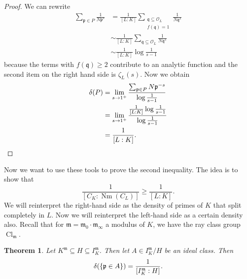 \documentclass[leqno, openany]{memoir}
\newtheorem{thm}{Theorem}[section]
\theoremstyle{definition}
\theoremstyle{remark}
\theoremstyle{plain}
\theoremstyle{definition}
\theoremstyle{remark}
\newcommand{\mc}[1]{\mathcal{#1}}
\newcommand{\mf}[1]{\mathfrak{#1}}
\DeclareMathOperator{\Cl}{Cl}
\DeclareMathOperator{\Nm}{Nm}
\begin{document}
\begin{proof}
    We can rewrite
    \begin{align*}
        \sum_{\mf{p} \in P} \frac{1}{N\mf{p}^s} &= \frac{1}{[L:K]} \sum_{\substack{\mf{q} \subseteq \mc{O}_L \\ f(\mf{q}) = 1}} \frac{1}{N\mf{q}^s} \\
                                                &\sim \frac{1}{[L:K]} \sum_{\mf{q} \subseteq \mc{O}_L} \frac{1}{N\mf{q}^s} \\
                                                &\sim \frac{1}{[L:K]} \log \frac{1}{s-1}
    \end{align*}
    because the terms with $f(\mf{q}) \geq 2$ contribute to an analytic function and the second item on the right hand side is $\zeta_L(s)$. Now we obtain
    \begin{align*}
        \delta(P) &= \lim_{s \to 1^+} \frac{\sum_{\mf{p} \in P} N\mf{p}^{-s}}{\log \frac{1}{s-1}} \\
                  &= \lim_{s \to 1^+} \frac{\frac{1}{[L:K]} \log \frac{1}{s-1}}{\log \frac{1}{s-1}} \\
                  &= \frac{1}{[L:K]}. \qedhere
    \end{align*}
\end{proof}

Now we want to use these tools to prove the second inequality. The idea is to show that
\[ \frac{1}{[C_K: \Nm(C_L)]} \geq \frac{1}{[L:K]}. \]
We will reinterpret the right-hand side as the density of primes of $K$ that split completely in $L$. Now we will reinterpret the left-hand side as a certain density also. Recall that for $\mf{m} = \mf{m}_0 \cdot \mf{m}_{\infty}$ a modulus of $K$, we have the ray class group $\Cl_{\mf{m}}$. 

\begin{thm}
    Let $K^{\mf{m}} \subseteq H \subseteq I_K^{\mf{m}}$. Then let $A \in I_K^{\mf{m}}/H$ be an ideal class. Then
    \[ \delta(\qty{\mf{p} \in A}) = \frac{1}{[I_K^{\mf{m}} : H]}. \]
\end{thm}
\end{document}
